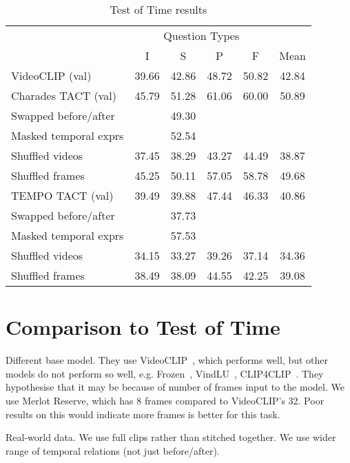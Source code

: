 \begin{table}[tp] 
    \centering 
    \caption{Test of Time results}
    \label{tab:tot_star} 
    \begin{tabular}{lccccc} 
        \toprule
        \multicolumn{1}{c}{}    & \multicolumn{4}{c}{Question Types}            & \multicolumn{1}{c}{} \\
                                    \cmidrule(){2-5}
                                & I           & S        & P          & F           & Mean \\
        \cmidrule(r){1-1}           \cmidrule(){2-5}                                    \cmidrule(l){6-6}
        VideoCLIP (val)         & 39.66       & 42.86    & 48.72      & 50.82       & 42.84 \\
		Charades TACT (val)		& 45.79		  & 51.28	 & 61.06	  & 60.00		& 50.89 \\
		Swapped before/after    &			  &	49.30	 &			  &				& \\
		Masked temporal exprs   &			  & 52.54    &			  &				& \\
		Shuffled videos			& 37.45		  & 38.29	 & 43.27	  & 44.49		& 38.87 \\
		Shuffled frames			& 45.25		  & 50.11    & 57.05      & 58.78		& 49.68 \\
        \cmidrule(r){1-1}           \cmidrule(){2-5}                                    \cmidrule(l){6-6}
		TEMPO TACT (val)		& 39.49		  & 39.88	 & 47.44	  & 46.33		& 40.86 \\
		Swapped before/after    &			  & 37.73    &			  &				& \\
		Masked temporal exprs   &			  & 57.53    &			  &				& \\
		Shuffled videos			& 34.15		  & 33.27	 & 39.26	  & 37.14		& 34.36 \\
		Shuffled frames			& 38.49		  & 38.09	 & 44.55	  & 42.25		& 39.08 \\
        \bottomrule
    \end{tabular} 
\end{table} 

\section{Comparison to Test of Time}
\label{sec:tactcompare}

Different base model. They use VideoCLIP~\citep{xu2021videoclip}, which performs well,
but other models do not perform so well, e.g. Frozen~\citep{bain2021frozen}, 
VindLU~\citep{cheng2023vindlu}, CLIP4CLIP~\citep{luo2022clip4clip}. They hypothesise
that it may be because of number of frames input to the model. We use Merlot Reserve,
which has 8 frames compared to VideoCLIP's 32. Poor results on this would indicate
more frames is better for this task.

Real-world data. We use full clips rather than stitched together. We use wider range
of temporal relations (not just before/after).
